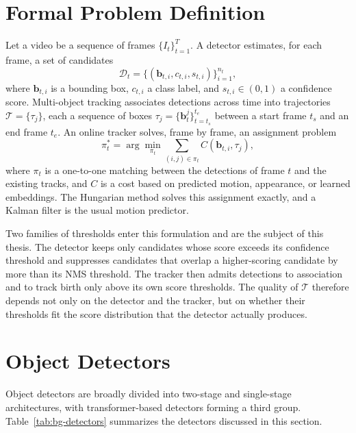 \section{Formal Problem Definition}\label{sec:bg-problem}
Let a video be a sequence of frames $\{I_t\}_{t=1}^{T}$. A detector estimates, for each frame, a set of candidates
\begin{equation}
\mathcal{D}_t = \{(\mathbf{b}_{t,i}, c_{t,i}, s_{t,i})\}_{i=1}^{n_t},
\label{eq:bg-dets}
\end{equation}
where $\mathbf{b}_{t,i}$ is a bounding box, $c_{t,i}$ a class label, and $s_{t,i}\in(0,1)$ a confidence score. Multi-object tracking associates detections across time into trajectories $\mathcal{T}=\{\tau_j\}$, each a sequence of boxes $\tau_j = \{\mathbf{b}^{j}_t\}_{t=t_s}^{t_e}$ between a start frame $t_s$ and an end frame $t_e$. An online tracker solves, frame by frame, an assignment problem
\begin{equation}
\pi_t^{*} = \arg\min_{\pi_t} \sum_{(i,j)\in\pi_t} C\left(\mathbf{b}_{t,i}, \tau_j\right),
\label{eq:bg-assign}
\end{equation}
where $\pi_t$ is a one-to-one matching between the detections of frame $t$ and the existing tracks, and $C$ is a cost based on predicted motion, appearance, or learned embeddings. The Hungarian method \cite{kuhn1955hungarian} solves this assignment exactly, and a Kalman filter \cite{kalman1960} is the usual motion predictor.

Two families of thresholds enter this formulation and are the subject of this thesis. The detector keeps only candidates whose score exceeds its confidence threshold and suppresses candidates that overlap a higher-scoring candidate by more than its NMS threshold. The tracker then admits detections to association and to track birth only above its own score thresholds. The quality of $\mathcal{T}$ therefore depends not only on the detector and the tracker, but on whether their thresholds fit the score distribution that the detector actually produces.

\section{Object Detectors}\label{sec:bg-detectors}
Object detectors are broadly divided into two-stage and single-stage architectures, with transformer-based detectors forming a third group. Table~\ref{tab:bg-detectors} summarizes the detectors discussed in this section.

